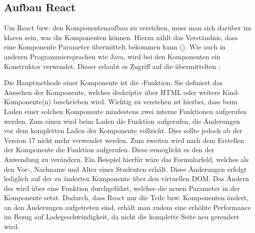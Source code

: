 
\subsection{Aufbau React}
\label{ssec:AufbauReact}

Um React bzw. den Komponentenaufbau zu verstehen, muss man sich darüber im klaren sein, was die Komponenten können. 
Hierzu zählt \ua das Verständnis, dass eine Komponente Parameter übermittelt bekommen kann (\props). 
Wie auch in anderen Programmiersprachen wie \zb Java, wird bei den Komponenten ein Konstruktor  verwendet.
Dieser erlaubt es Zugriff auf die übermittelten \props. 

Die Hauptmethode einer Komponente ist die \render-Funktion. 
Sie definiert das Aussehen der Komponente, welches deskriptiv über \acs{HTML} oder weitere Kind-Kompo\-nente(n) beschrieben wird. 
Wichtig zu verstehen ist hierbei, dass beim Laden einer solchen Komponente mindestens zwei interne Funktionen aufgerufen werden. 
Zum einen wird beim Laden die Funktion \cwm aufgerufen, die Änderungen vor dem kompletten Laden der Komponente vollzieht.
Dies sollte jedoch ab der Version 17 nicht mehr verwendet werden. 
Zum zweiten wird nach dem Erstellen der Komponente die Funktion \cdm aufgerufen. 
Diese ermöglicht es \zb den \state  der Anwendung zu verändern. 
Ein Beispiel hierfür wäre das Formularfeld, welches als \props den Vor-, Nachname und Alter eines Studenten erhält. 
Diese Änderungen erfolgt lediglich auf der zu änderten Komponente über den virtuellen \acs{DOM}. 
Das Ändern des \state wird über eine Funktion \exampleState durchgeführt, welches die neuen Parameter in der Komponente setzt.
Dadurch, dass React nur die Teile bzw. Komponenten ändert, an den Änderungen aufgetreten sind, erhält man zudem eine erhöhte Performance im Bezug auf Ladegeschwindigkeit, da nicht die komplette Seite neu gerendert wird. 

